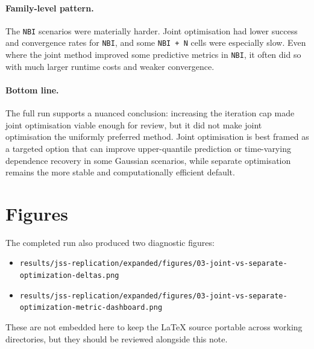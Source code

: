 \documentclass[11pt]{article}
\begin{document}
\paragraph{Family-level pattern.}
The \texttt{NBI} scenarios were materially harder.  Joint optimisation had
lower success and convergence rates for \texttt{NBI}, and some
\texttt{NBI + N} cells were especially slow.  Even where the joint method
improved some predictive metrics in \texttt{NBI}, it often did so with much
larger runtime costs and weaker convergence.

\paragraph{Bottom line.}
The full run supports a nuanced conclusion: increasing the iteration cap made
joint optimisation viable enough for review, but it did not make joint
optimisation the uniformly preferred method.  Joint optimisation is best framed
as a targeted option that can improve upper-quantile prediction or
time-varying dependence recovery in some Gaussian scenarios, while separate
optimisation remains the more stable and computationally efficient default.

\section{Figures}

The completed run also produced two diagnostic figures:

\begin{itemize}
  \item
  \texttt{results/jss-replication/expanded/figures/03-joint-vs-separate-optimization-deltas.png}
  \item
  \texttt{results/jss-replication/expanded/figures/03-joint-vs-separate-optimization-metric-dashboard.png}
\end{itemize}

These are not embedded here to keep the LaTeX source portable across working
directories, but they should be reviewed alongside this note.
\end{document}
